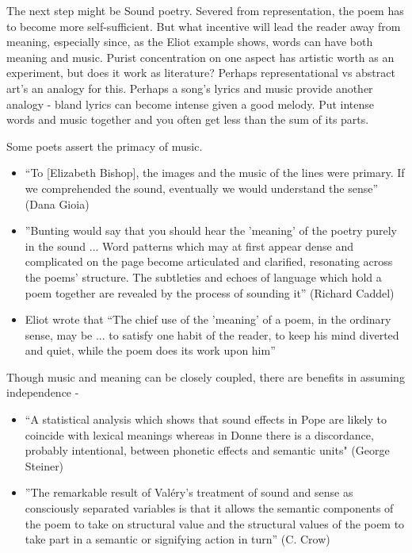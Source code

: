 \documentclass[11pt]{article}
\begin{document}
The next step might be Sound poetry. Severed from representation, the poem has to become more self-sufficient. But what incentive will lead the reader away from meaning, especially since, as the Eliot example shows, words can have both meaning and music. Purist concentration on one aspect has artistic worth as an experiment, but does it work as literature? Perhaps representational vs abstract art's an analogy for this. Perhaps a song's lyrics and music provide another analogy - bland lyrics can become intense given a good melody. Put intense words and music together and you often get less than the sum of its parts.



Some poets assert the primacy of music.
\begin{itemize}
\item  ``To [Elizabeth Bishop], the images and the music of the lines were primary. If we comprehended the sound, eventually we would understand the sense'' (Dana Gioia) 
\item ''Bunting would say that you should hear the 'meaning' of the poetry purely in the sound ... Word patterns which may at first appear dense and complicated on the page become articulated and clarified, resonating across the poems' structure. The subtleties and echoes of language which hold a poem together are revealed by the process of sounding it'' (Richard Caddel)
\item  Eliot wrote that ``The chief use of the 'meaning' of a poem, in the ordinary sense, may be ... to satisfy one habit of the reader, to keep his mind diverted and quiet, while the poem does its work upon him''

\end{itemize}

Though music and meaning can be closely coupled, there are benefits in assuming independence - 
\begin{itemize}
\item 
``A statistical analysis which shows that sound effects in Pope are likely to coincide with lexical meanings whereas in Donne there is a discordance, probably intentional, between phonetic effects and semantic units"  (George Steiner)
\item ''The remarkable result of Valéry's treatment of sound and sense as consciously separated variables is that it allows the semantic components of the poem to take on structural value and the structural values of the poem to take part in a semantic or signifying action in turn'' (C. Crow)
\end{itemize}
\end{document}
